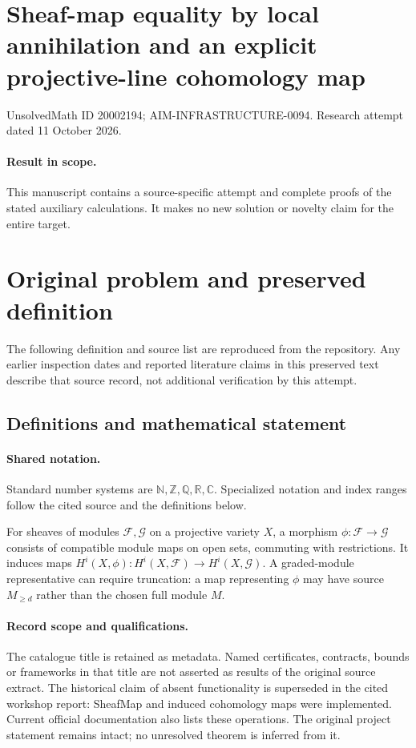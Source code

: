 \documentclass[11pt]{article}
\begin{document}
\section*{Sheaf-map equality by local annihilation and an explicit projective-line cohomology map}
\noindent UnsolvedMath ID 20002194; AIM-INFRASTRUCTURE-0094. Research attempt dated 11 October 2026.
\paragraph{Result in scope.}This manuscript contains a source-specific attempt and complete proofs of the stated auxiliary calculations. It makes no new solution or novelty claim for the entire target.
\section{Original problem and preserved definition}
The following definition and source list are reproduced from the repository. Any earlier inspection dates and reported literature claims in this preserved text describe that source record, not additional verification by this attempt.
\subsection{Definitions and mathematical statement}

\paragraph{Shared notation.}Standard number systems are $\mathbb N,\mathbb Z,\mathbb Q,\mathbb R,\mathbb C$. Specialized notation and index ranges follow the cited source and the definitions below.


For sheaves of modules $\mathcal F,\mathcal G$ on a projective variety $X$, a morphism $\phi:\mathcal F\to\mathcal G$ consists of compatible module maps on open sets, commuting with restrictions. It induces maps $H^i(X,\phi):H^i(X,\mathcal F)\to H^i(X,\mathcal G)$. A graded-module representative can require truncation: a map representing $\phi$ may have source $M_{\geq d}$ rather than the chosen full module $M$.
\paragraph{Record scope and qualifications.}
The catalogue title is retained as metadata. Named certificates, contracts, bounds or frameworks in that title are not asserted as results of the original source extract.
The historical claim of absent functionality is superseded in the cited workshop report: SheafMap and induced cohomology maps were implemented. Current official documentation also lists these operations. The original project statement remains intact; no unresolved theorem is inferred from it.
\end{document}
